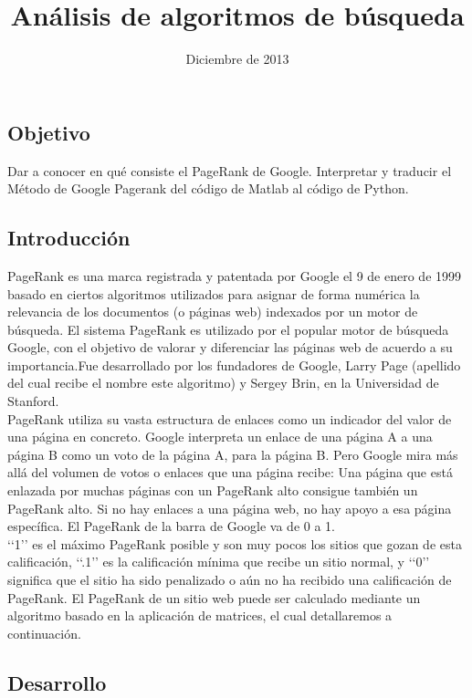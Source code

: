 \documentclass[letterpaper,11pt]{article}
\renewcommand{\quote}[1]{\lq\lq#1\rq\rq}
\begin{document}
\title {Análisis de algoritmos de búsqueda}
\date{Diciembre de 2013}
\maketitle

\subsection*{Objetivo}

Dar a conocer en qué consiste el PageRank de Google. Interpretar y traducir el Método de Google Pagerank del código de Matlab al código de Python.

\subsection*{Introducción}

PageRank es una marca registrada y patentada  por Google el 9 de enero de 1999 basado en ciertos algoritmos utilizados para asignar de forma numérica la relevancia de los documentos (o páginas web) indexados por un motor de búsqueda. El sistema PageRank es utilizado por el popular motor de búsqueda Google, con el objetivo de valorar y diferenciar las páginas web de acuerdo a su importancia.Fue desarrollado por los fundadores de Google, Larry Page (apellido del cual recibe el nombre este algoritmo) y Sergey Brin, en la Universidad de Stanford.\\
PageRank utiliza su vasta estructura de enlaces como un indicador del valor de una página en concreto. Google interpreta un enlace de una página A a una página B como un voto de la página A, para la página B. Pero Google mira más allá del volumen de votos o enlaces que una página recibe: Una página que está enlazada por muchas páginas con un PageRank alto consigue también un PageRank alto. Si no hay enlaces a una página web, no hay apoyo a esa página específica. El PageRank de la barra de Google va de 0 a 1.\\
\quote{1}  es el máximo PageRank posible y son muy pocos los sitios que gozan de esta calificación, \quote{.1} es la calificación mínima que recibe un sitio normal, y \quote{0} significa que el sitio ha sido penalizado o aún no ha recibido una calificación de PageRank. El PageRank de un sitio web puede ser calculado mediante un algoritmo basado en la aplicación de matrices, el cual detallaremos a continuación.


\subsection*{Desarrollo}
\end{document}
